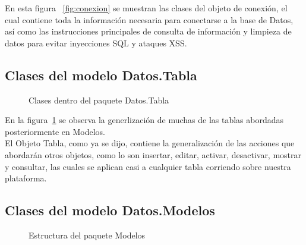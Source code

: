     En esta figura ~\ref{fig:conexion} se muestran las clases del objeto de conexión, el cual contiene toda la información necesaria para conectarse a la base de Datos, así como las instrucciones principales de consulta de información y limpieza de datos para evitar inyecciones SQL y ataques XSS.
    
    \subsection{Clases del modelo Datos.Tabla}
    
    \begin{figure}[htbp!]
    	\begin{center}
    		\caption{Clases dentro del paquete Datos.Tabla}
    		\label{fig:tabla}
    	\end{center}
    \end{figure}
    
    En la figura~\ref{fig:tabla} se observa la generlización de muchas de las tablas abordadas posteriormente en Modelos. \\
    El Objeto Tabla, como ya se dijo, contiene la generalización de las acciones que abordarán otros objetos, como lo son insertar, editar, activar, desactivar, mostrar y consultar, las cuales se aplican casi a cualquier tabla corriendo sobre nuestra plataforma. \\
    
    \subsection{Clases del modelo Datos.Modelos}
    
    \begin{figure}[htbp!]
    	\begin{center}
    		\caption{Estructura del paquete Modelos}
    		\label{fig:modelos}
    	\end{center}
    \end{figure}
    
